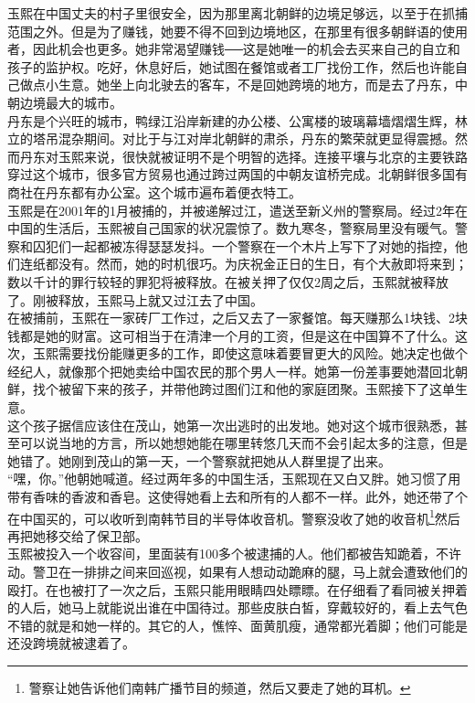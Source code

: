 \begin{multicols}{\theparacolNo}
玉熙在中国丈夫的村子里很安全，因为那里离北朝鲜的边境足够远，以至于在抓捕范围之外。但是为了赚钱，她要不得不回到边境地区，在那里有很多朝鲜语的使用者，因此机会也更多。她非常渴望赚钱──这是她唯一的机会去买来自己的自立和孩子的监护权。吃好，休息好后，她试图在餐馆或者工厂找份工作，然后也许能自己做点小生意。她坐上向北驶去的客车，不是回她跨境的地方，而是去了丹东，中朝边境最大的城市。\\

丹东是个兴旺的城市，鸭绿江沿岸新建的办公楼、公寓楼的玻璃幕墙熠熠生辉，林立的塔吊混杂期间。对比于与江对岸北朝鲜的肃杀，丹东的繁荣就更显得震撼。然而丹东对玉熙来说，很快就被证明不是个明智的选择。连接平壤与北京的主要铁路穿过这个城市，很多官方贸易也通过跨过两国的中朝友谊桥完成。北朝鲜很多国有商社在丹东都有办公室。这个城市遍布着便衣特工。\\

玉熙是在2001年的1月被捕的，并被递解过江，遣送至新义州的警察局。经过2年在中国的生活后，玉熙被自己国家的状况震惊了。数九寒冬，警察局里没有暖气。警察和囚犯们一起都被冻得瑟瑟发抖。一个警察在一个木片上写下了对她的指控，他们连纸都没有。然而，她的时机很巧。为庆祝金正日的生日，有个大赦即将来到；数以千计的罪行较轻的罪犯将被释放。在被关押了仅仅2周之后，玉熙就被释放了。刚被释放，玉熙马上就又过江去了中国。\\

在被捕前，玉熙在一家砖厂工作过，之后又去了一家餐馆。每天赚那么1块钱、2块钱都是她的财富。这可相当于在清津一个月的工资，但是这在中国算不了什么。这次，玉熙需要找份能赚更多的工作，即使这意味着要冒更大的风险。她决定也做个经纪人，就像那个把她卖给中国农民的那个男人一样。她第一份差事要她潜回北朝鲜，找个被留下来的孩子，并带他跨过图们江和他的家庭团聚。玉熙接下了这单生意。\\

这个孩子据信应该住在茂山，她第一次出逃时的出发地。她对这个城市很熟悉，甚至可以说当地的方言，所以她想她能在哪里转悠几天而不会引起太多的注意，但是她错了。她刚到茂山的第一天，一个警察就把她从人群里提了出来。\\

“嘿，你。”他朝她喊道。经过两年多的中国生活，玉熙现在又白又胖。她习惯了用带有香味的香波和香皂。这使得她看上去和所有的人都不一样。此外，她还带了个在中国买的，可以收听到南韩节目的半导体收音机。警察没收了她的收音机\footnote{警察让她告诉他们南韩广播节目的频道，然后又要走了她的耳机。}然后再把她移交给了保卫部。\\

玉熙被投入一个收容间，里面装有100多个被逮捕的人。他们都被告知跪着，不许动。警卫在一排排之间来回巡视，如果有人想动动跪麻的腿，马上就会遭致他们的殴打。在也被打了一次之后，玉熙只能用眼睛四处瞟瞟。在仔细看了看同被关押着的人后，她马上就能说出谁在中国待过。那些皮肤白皙，穿戴较好的，看上去气色不错的就是和她一样的。其它的人，憔悴、面黄肌瘦，通常都光着脚；他们可能是还没跨境就被逮着了。\\


\end{multicols}
